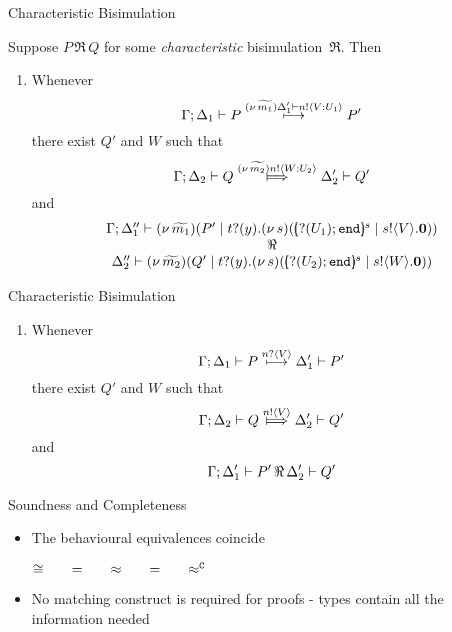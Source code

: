 \documentclass{beamer}
\begin{document}
	\begin{frame}{Characteristic Bisimulation}

		Suppose $P\, \Re\, Q$ for some {\em characteristic} bisimulation~$\Re$. Then
		\begin{enumerate}[$(\star)$]
			\item	Whenever
				\[
					\Gamma; \Delta_1 \vdash P \stackrel{(\nu\, \widetilde{m_1}) \Delta_1' \vdash n ! \langle V: U_1 \rangle}{\longmapsto} P'
				\]
				there exist $Q'$ and $W$ such that 
				\[
					\Gamma; \Delta_2 \proves Q \Hby{\news{\widetilde{m_2}} \bactout{n}{W: U_2}} \Delta_2' \proves Q'
				\]
				and
				\[
					\begin{array}{c}
						\Gamma; \Delta_1'' \proves \newsp{\widetilde{m_1}}{P' \Par \binp{t}{y}\newsp{s}{\mapchar{\btinp{U_1} \tinact}{s} \Par \bout{s}{V} \inact}}
						\\
						\Re
						\\
						\Delta_2'' \proves \newsp{\widetilde{m_2}}{Q' \Par \binp{t}{y}\newsp{s}{\mapchar{\btinp{U_2} \tinact}{s} \Par \bout{s}{W} \inact}}
					\end{array}
				\]
		\end{enumerate}
	\end{frame}

	\begin{frame}{Characteristic Bisimulation}
		\begin{enumerate}[$(\star)$]
			\item	Whenever
				\[
					\Gamma; \Delta_1 \vdash P \stackrel{n ? \langle V \rangle}{\longmapsto} \Delta_1' \vdash P'
				\]
				there exist $Q'$ and $W$ such that 
				\[
					\Gamma; \Delta_2 \proves Q \Hby{\bactout{n}{V}} \Delta_2' \proves Q'
				\]
				and
				\[
					\Gamma; \Delta_1' \vdash P'\, \Re\, \Delta_2' \vdash Q'
				\]
		\end{enumerate}
	\end{frame}

	\begin{frame}{Soundness and Completeness}
		\begin{itemize}
			\item	The behavioural equivalences coincide

				\begin{theorem}
					\begin{center}
					$\cong \qquad =\qquad \approx \qquad =\qquad \approx^\mathtt{C}$
					\end{center}
				\end{theorem}

			\item	No matching construct is required for proofs - types contain all the information needed
		\end{itemize}
	\end{frame}
\end{document}
